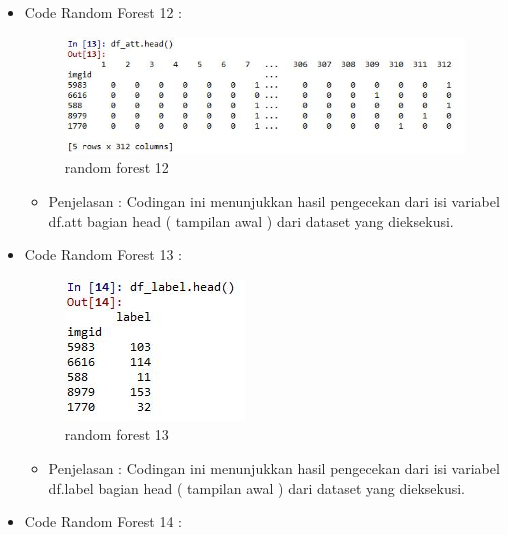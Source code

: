 \begin{enumerate}
\begin{itemize}
\begin{itemize}
\par
\par
\end{itemize}
\item Code Random Forest 12 :
\par
\begin{figure}[ht]
\centering
\includegraphics[scale=0.2]{figures/ran12.jpg}
\caption{random forest 12}
\label{contoh}
\end{figure}
\par
\begin{itemize}
\item Penjelasan : Codingan ini menunjukkan hasil pengecekan dari isi variabel df.att bagian head ( tampilan awal ) dari dataset yang dieksekusi.
\par
\par
\end{itemize}
\item Code Random Forest 13 :
\par
\begin{figure}[ht]
\centering
\includegraphics[scale=0.2]{figures/ran13.jpg}
\caption{random forest 13}
\label{contoh}
\end{figure}
\par
\begin{itemize}
\item Penjelasan : Codingan ini menunjukkan hasil pengecekan dari isi variabel df.label bagian head ( tampilan awal ) dari dataset yang dieksekusi.
\par
\par
\end{itemize}
\item Code Random Forest 14 :
\par
\begin{figure}[ht]

\end{figure}
\end{itemize}
\end{enumerate}
